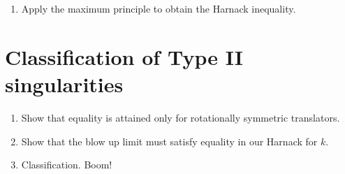 \documentclass{amsart}
\begin{document}
\begin{enumerate}
\item Apply the maximum principle to obtain the Harnack inequality.
\end{enumerate}

\section{Classification of Type II singularities}

\begin{enumerate}
\item Show that equality is attained only for rotationally symmetric translators.
\item Show that the blow up limit must satisfy equality in our Harnack for $k$.
\item Classification. Boom!
\end{enumerate}



\end{document}
